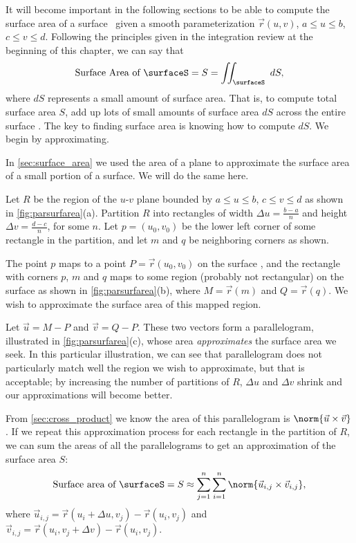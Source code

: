 It will become important in the following sections to be able to compute the surface area of a surface \surfaceS\ given a smooth parameterization $\vec r(u,v)$, $a\leq u\leq b$, $c\leq v\leq d$. Following the principles given in the integration review at the beginning of this chapter, we can say that
\[\text{Surface Area of \surfaceS}=S = \iint_{\surfaceS}\ dS,\]
where $dS$ represents a small amount of surface area. That is, to compute total surface area $S$, add up lots of small amounts of surface area $dS$ across the entire surface \surfaceS. The key to finding surface area is knowing how to compute $dS$. We begin by approximating.

In \autoref{sec:surface_area} we used the area of a plane to approximate the surface area of a small portion of a surface. We will do the same here.

Let $R$ be the region of the $u$-$v$ plane bounded by $a\leq u\leq b$, $c\leq v\leq d$ as shown in \autoref{fig:parsurfarea}(a). Partition $R$ into rectangles of width $\Delta u = \frac{b-a}n$ and height $\Delta v = \frac{d-c}n$, for some $n$. Let $p=(u_0,v_0)$ be the lower left corner of some rectangle in the partition, and let $m$ and $q$ be neighboring corners as shown.

The point $p$ maps to a point $P = \vec r(u_0,v_0)$ on the surface \surfaceS, and the rectangle with corners $p$, $m$ and $q$ maps to some region (probably not rectangular) on the surface as shown in \autoref{fig:parsurfarea}(b), where $M = \vec r(m)$ and $Q = \vec r(q)$. We wish to approximate the surface area of this mapped region.

Let $\vec u = M-P$ and $\vec v = Q-P$. These two vectors form a parallelogram, illustrated in \autoref{fig:parsurfarea}(c), whose area \emph{approximates} the surface area we seek. In this particular illustration, we can see that parallelogram does not particularly match well the region we wish to approximate, but that is acceptable; by increasing the number of partitions of $R$, $\Delta u$ and $\Delta v$ shrink and our approximations will become better.

From \autoref{sec:cross_product} we know the area of this parallelogram is $\norm{\vec u\times \vec v}$. If we repeat this approximation process for each rectangle in the partition of $R$, we can sum the areas of all the parallelograms to get an approximation of the surface area $S$:
\[
\text{Surface area of \surfaceS} =S
\approx \sum_{j=1}^n\sum_{i=1}^n \norm{\vec u_{i,j}\times \vec v_{i,j}},
\]
where $\vec u_{i,j} = \vec r(u_i+\Delta u,v_j) - \vec r(u_i,v_j)$ and $\vec v_{i,j} = \vec r(u_i,v_j+\Delta v)-\vec r(u_i,v_j)$.

